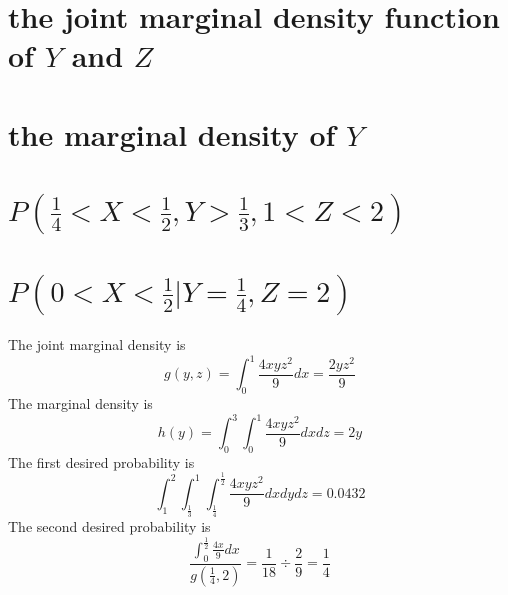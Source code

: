\documentclass[answers]{exam}
\begin{document}
\begin{questions}

\begin{parts}
\part{the joint marginal density function of $Y$ and $Z$}
\part{the marginal density of $Y$}
\part{$P(\frac{1}{4}<X<\frac{1}{2},Y>\frac{1}{3},1<Z<2)$}
\part{$P(0<X<\frac{1}{2}|Y=\frac{1}{4},Z=2)$}
\end{parts}

\begin{solution}
	The joint marginal density is
	$$g(y,z) = \int_0^1 \frac{4xyz^2}{9}dx = \frac{2yz^2}{9}$$
	The marginal density is
	$$h(y) = \int_0^3\int_0^1 \frac{4xyz^2}{9}dxdz = 2y$$
	The first desired probability is
	$$\int_1^2\int_{\frac{1}{3}}^1\int_{\frac{1}{4}}^{\frac{1}{2}} \frac{4xyz^2}{9}dxdydz = 0.0432$$
	The second desired probability is
	$$\frac{\int_0^\frac{1}{2} \frac{4x}{9}dx}{g\left(\frac{1}{4},2\right)} = \frac{1}{18}\div\frac{2}{9} = \frac{1}{4}$$
\end{solution}

\end{questions}
\end{document}
